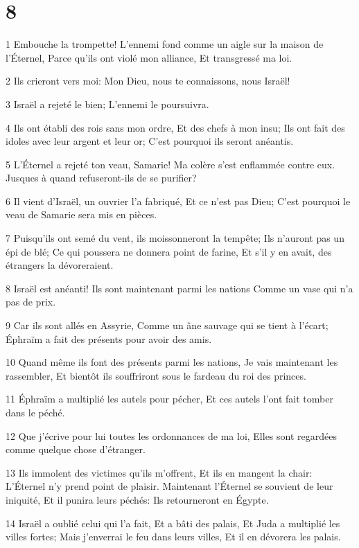 \chapter{8}

\par 1 Embouche la trompette! L'ennemi fond comme un aigle sur la maison de l'Éternel, Parce qu'ils ont violé mon alliance, Et transgressé ma loi.
\par 2 Ils crieront vers moi: Mon Dieu, nous te connaissons, nous Israël!
\par 3 Israël a rejeté le bien; L'ennemi le poursuivra.
\par 4 Ils ont établi des rois sans mon ordre, Et des chefs à mon insu; Ils ont fait des idoles avec leur argent et leur or; C'est pourquoi ils seront anéantis.
\par 5 L'Éternel a rejeté ton veau, Samarie! Ma colère s'est enflammée contre eux. Jusques à quand refuseront-ils de se purifier?
\par 6 Il vient d'Israël, un ouvrier l'a fabriqué, Et ce n'est pas Dieu; C'est pourquoi le veau de Samarie sera mis en pièces.
\par 7 Puisqu'ils ont semé du vent, ils moissonneront la tempête; Ils n'auront pas un épi de blé; Ce qui poussera ne donnera point de farine, Et s'il y en avait, des étrangers la dévoreraient.
\par 8 Israël est anéanti! Ils sont maintenant parmi les nations Comme un vase qui n'a pas de prix.
\par 9 Car ils sont allés en Assyrie, Comme un âne sauvage qui se tient à l'écart; Éphraïm a fait des présents pour avoir des amis.
\par 10 Quand même ils font des présents parmi les nations, Je vais maintenant les rassembler, Et bientôt ils souffriront sous le fardeau du roi des princes.
\par 11 Éphraïm a multiplié les autels pour pécher, Et ces autels l'ont fait tomber dans le péché.
\par 12 Que j'écrive pour lui toutes les ordonnances de ma loi, Elles sont regardées comme quelque chose d'étranger.
\par 13 Ils immolent des victimes qu'ils m'offrent, Et ils en mangent la chair: L'Éternel n'y prend point de plaisir. Maintenant l'Éternel se souvient de leur iniquité, Et il punira leurs péchés: Ils retourneront en Égypte.
\par 14 Israël a oublié celui qui l'a fait, Et a bâti des palais, Et Juda a multiplié les villes fortes; Mais j'enverrai le feu dans leurs villes, Et il en dévorera les palais.

